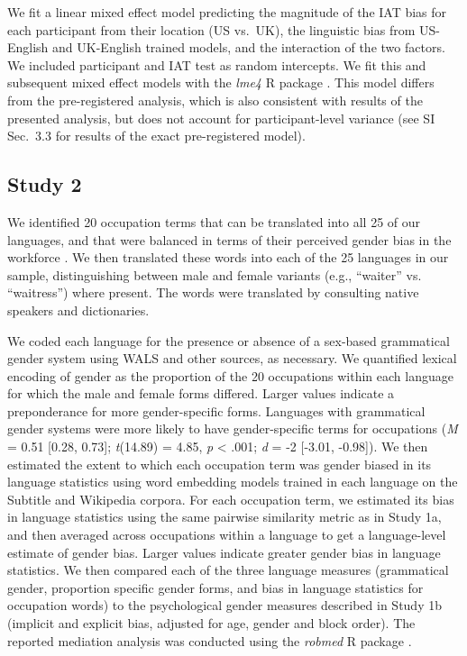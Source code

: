 \documentclass[9pt,twocolumn,twoside,lineno]{pnas-new}
\begin{document}
{We fit a linear mixed effect model predicting the magnitude of the IAT bias for each participant from their location (US vs.\ UK), the linguistic bias from US-English and UK-English trained models, and the interaction of the two factors. We included participant and IAT test as random intercepts. We fit this and subsequent mixed effect models with the \emph{lme4} R package \cite{lme4package}. This model differs from the pre-registered analysis, which is also consistent with results of the presented analysis, but does not account for participant-level variance (see SI Sec.\ 3.3 for results of the exact pre-registered model).


\subsection*{Study 2}

We identified 20 occupation terms that can be translated into  all 25 of our languages, and that were balanced in terms of their perceived gender bias in the workforce \cite{misersky2014norms}. We
then translated these words into each of the 25 languages in our sample,
distinguishing between male and female variants (e.g., \enquote{waiter}
vs. \enquote{waitress}) where present. The words were translated by
consulting native speakers and dictionaries.

We coded each language for the presence or absence of a sex-based grammatical gender system using WALS \cite{wals} and other sources, as necessary. We quantified lexical encoding of gender as the proportion of the 20 occupations within each language for which the male and female forms differed. Larger values indicate a preponderance for more gender-specific forms.  Languages with grammatical gender systems were more likely to have gender-specific terms for occupations
(\emph{M} = 0.51 {[}0.28, 0.73{]}; \emph{t}(14.89) = 4.85, \emph{p} \textless{} .001; \emph{d} = -2 {[}-3.01, -0.98{]}). We then estimated the extent to which each occupation term was gender biased in its language statistics using word
embedding models trained in each language on the Subtitle and Wikipedia
corpora. For each occupation term, we estimated its bias in language
statistics using the same pairwise similarity metric as in Study 1a, and
then averaged across occupations within a language to get a
language-level estimate of gender bias. Larger values indicate greater
gender bias in language statistics. We then compared each of the three
language measures (grammatical gender, proportion specific gender forms,
and bias in language statistics for occupation words) to the
psychological gender measures described in Study 1b (implicit and
explicit bias, adjusted for age, gender and block order). The reported mediation analysis was conducted using the \emph{robmed} R package \cite{robmed}.

}

\showmatmethods{} %

\showacknow{} %


\end{document}

